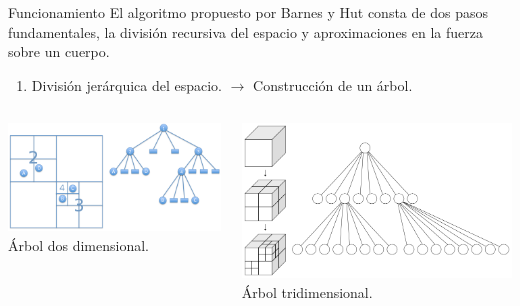 \documentclass[handout]{beamer}
\newcounter{stepsBarnes}
\newcommand{\seti}{\setcounter{stepsBarnes}{\value{enumi}}}
\begin{document}
\begin{frame}{Funcionamiento}
	El algoritmo propuesto por Barnes y Hut consta de dos pasos fundamentales, la divisi\'on recursiva del espacio y aproximaciones en la fuerza sobre un cuerpo. \pause
	\begin{enumerate}
		\item Divisi\'on jer\'arquica del espacio. $\rightarrow$ Construcci\'on de un \'arbol.\pause
		\seti
	\end{enumerate}
	\begin{columns}
		\begin{column}{0.5\linewidth}
			\centering
			\includegraphics[width=\linewidth]{sources/images/quadtree.png}\\
			\'Arbol dos dimensional.\pause
		\end{column}
		\begin{column}{0.5\linewidth}
			\centering
			\includegraphics[width=\linewidth]{sources/images/octree.png}\\
			\'Arbol tridimensional.
		\end{column}
	\end{columns}
\end{frame}
\end{document}
